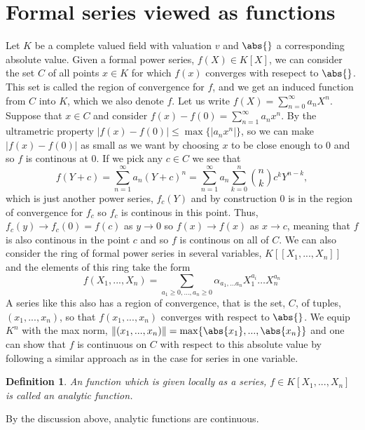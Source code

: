 \documentclass{article}
\newtheorem{definition}{Definition}[section]
\numberwithin{equation}{section}
\begin{document}
\section{Formal series viewed as functions}
Let $K$ be a complete valued field with valuation $v$ and $\abs{}$ a corresponding absolute value. Given a formal power series, $f(X) \in K[X]$, we can consider the set $C$ of all points $x \in K$ for which $f(x)$ converges with resepect to $\abs{}$. This set is called the region of convergence for $f$, and we get an induced function from $C$ into $K$, which we also denote $f$. Let us write $f(X) = \sum_{n=0}^\infty a_n X^n$. Suppose that $x \in C$ and consider $f(x) - f(0) = \sum_{n=1}^\infty a_n x^n$. By the ultrametric property $|f(x) - f(0)| \leq \max \{ |a_n x^n| \}$, so we can make $|f(x) - f(0)|$ as small as we want by choosing $x$ to be close enough to 0 and so $f$ is continous at 0. If we pick any $c \in C$ we see that 
$$f(Y + c) = \sum_{n=1}^\infty a_n (Y + c)^n = \sum_{n=1}^\infty a_n \sum_{k = 0}^n \binom{n}{k} c^{k}Y^{n-k},$$
which is just another power series, $f_c(Y)$ and by construction $0$ is in the region of convergence for $f_c$ so $f_c$ is continous in this point. Thus, $f_c(y) \to f_c(0) = f(c)$ as $y \to 0$ so $f(x) \to f(x)$ as $x \to c$, meaning that $f$ is also continous in the point $c$ and so $f$ is continous on all of $C$. We can also consider the ring of formal power series in several variables, $K[[X_1, ..., X_n]]$ and the elements of this ring take the form
$$f(X_1, ..., X_n) = \sum_{a_1 \geq 0, \ldots, a_n \geq 0} \alpha_{a_1, \ldots a_n} X_1^{a_i} \ldots X_n^{a_n}$$
A series like this also has a region of convergence, that is the set, $C$, of tuples, $(x_1, ..., x_n)$, so that $f(x_1, ..., x_n)$ converges with respect to $\abs{}$. We equip $K^n$ with the max norm, $\|(x_1, ..., x_n)\| = \max \{\abs{x_1}, ..., \abs{x_n} \}$ and one can show that $f$ is continuous on $C$ with respect to this absolute value by following a similar approach as in the case for series in one variable.

\begin{definition}
    An function which is given locally as a series, $f \in K[X_1, ..., X_n]$ is called an analytic function.
\end{definition}

By the discussion above, analytic functions are continuous.
\end{document}
